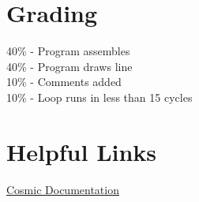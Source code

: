 \documentclass[
	12pt, %
]{fphw}
\begin{document}

\section*{Grading}

40\% - Program assembles\\
40\% - Program draws line\\
10\% - Comments added\\
10\% - Loop runs in less than 15 cycles\\



\section*{Helpful Links}
\href{https://github.com/clbx/Cosmic/tree/master/doc}{Cosmic Documentation}\\

\end{document}

